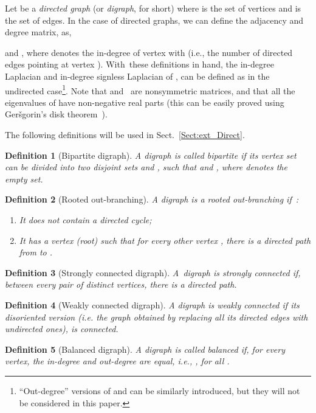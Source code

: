 \documentclass[letterpaper,9pt,twocolumn]{autart}
\newtheorem{definition}{\textbf{Definition}}
\begin{document}
Let  be a \emph{directed graph} (or \emph{digraph}, for short) where
 is the set of vertices and 
is the set of edges. In the case of directed graphs, we can define the adjacency
and degree matrix, as,

and ,
where  denotes the in-degree of vertex  with  (i.e., the number
of directed edges pointing at vertex ). With~these definitions in
hand, the in-degree Laplacian  and 
in-degree signless Laplacian  of , can be defined as
in the undirected case\footnote{``Out-degree'' versions of
 and  can be similarly
introduced, but they will not be considered in this paper.}. Note that 
 and~ are nonsymmetric
matrices, and that all the eigenvalues of  have
non-negative real parts (this can be easily proved using
Ger\v{s}gorin's disk theorem~\cite{OlfatiFaMu_IEEE07}). 

The following definitions will be used in
Sect.~\ref{Sect:ext_Direct}. 

\begin{definition}[Bipartite digraph]
A digraph  is called bipartite if its vertex set  can be divided into
two disjoint sets  and , such that  and
, where  denotes the
empty set.~\hfill
\end{definition}
\begin{definition}[Rooted out-branching]
A digraph  is a rooted out-branching if~\cite{MesbahiEg_book10}:
\begin{enumerate}
\item It does not contain a directed cycle;
\item It has a vertex  (root) such that for every
other vertex , there is a directed path from  to .~\hfill
\end{enumerate}
\end{definition}

\begin{definition}[Strongly connected digraph]
A~digraph is strongly connected if, between every pair of
distinct vertices, there is a directed path.~\hfill
\end{definition}

\begin{definition}[Weakly connected digraph]
A digraph is weakly connected if its disoriented version 
(i.e. the graph obtained by replacing all its directed edges with undirected ones), 
is connected.~\hfill
\end{definition}

\begin{definition}[Balanced digraph]
A digraph is called balanced if, for every vertex, the in-degree and out-degree are equal, i.e.,
, for all .~\hfill
\end{definition}
\end{document}
